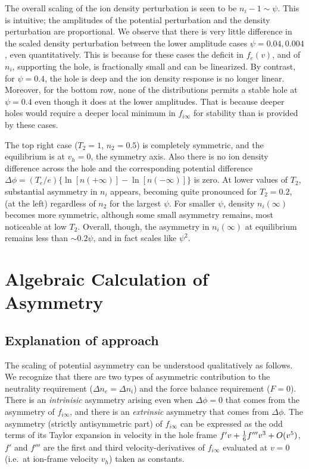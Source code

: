 \documentclass[12pt]{article}
\begin{document}
The overall scaling of the ion density perturbation is seen to be
$n_i-1\sim \psi$. This is intuitive; the amplitudes of the potential
perturbation and the density perturbation are proportional.  We
observe that there is very little difference in the scaled density
perturbation between the lower amplitude cases $\psi=0.04,0.004$, even
quantitatively. This is because for these cases the deficit in
$f_e(v)$, and of $n_i$, supporting the hole, is fractionally small and
can be linearized. By contrast, for $\psi=0.4$, the hole is deep and the
ion density response is no longer linear. Moreover, for the bottom
row, none of the distributions permits a stable hole at $\psi=0.4$
even though it does at the lower amplitudes. That is because deeper
holes would require a deeper local minimum in $f_{i\infty}$ for
stability than is provided by these cases.

The top right case ($T_{2}=1$, $n_2=0.5$) is completely symmetric, and
the equilibrium is at $v_h=0$, the symmetry axis. Also there is no ion
density difference across the hole and the corresponding potential
difference $\Delta\phi=(T_e/e)\{\ln[n(+\infty)]-\ln[n(-\infty)]\}$ is
zero. At lower values of $T_2$, substantial asymmetry in $n_i$
appears, becoming quite pronounced for $T_2=0.2$, (at the left)
regardless of $n_2$ for the largest $\psi$. For smaller $\psi$,
density $n_i(\infty)$ becomes more symmetric, although some small
asymmetry remains, most noticeable at low $T_2$. Overall, though, the
asymmetry in $n_i(\infty)$ at equilibrium remains less than
$\sim 0.2\psi$, and in fact scales like $\psi^2$.

\section{Algebraic Calculation of Asymmetry}

\subsection{Explanation of approach}
The scaling of potential asymmetry can be understood qualitatively as
follows. We recognize that there are two types of asymmetric
contribution to the neutrality requirement ($\Delta n_e=\Delta n_i$)
and the force balance requirement ($F=0$). There is an
\emph{intrinisic} asymmetry arising even when $\Delta\phi=0$ that
comes from the asymmetry of $f_{i\infty}$, and there is an
\emph{extrinsic} asymmetry that comes from $\Delta \phi$.  The
asymmetry (strictly antisymmetric part) of $f_{i\infty}$ can be
expressed as the odd terms of its Taylor expansion in velocity in the
hole frame $f'v+{1\over6}f'''v^3+O(v^5)$, $f'$ and $f'''$ are the
first and third velocity-derivatives of $f_{i\infty}$ evaluated at
$v=0$ (i.e.\ at ion-frame velocity $v_h$) taken as constants.
\end{document}
